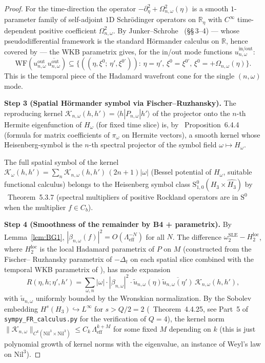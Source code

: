 \documentclass[11pt, a4paper]{article}
\newcommand{\RR}{\mathbb{R}}
\newcommand{\Hgroup}{H_3}
\newcommand{\Nil}{\mathrm{Nil}^3}
\newcommand{\piom}{\pi_\omega}
\newcommand{\WF}{\mathrm{WF}}
\newcommand{\om}{\omega}
\newcommand{\Lam}{\Lambda}
\newcommand{\Sym}{\mathrm{S}}
\newcommand{\dGhat}{\widehat{\Hgroup}}
\begin{document}
\begin{proof}
For the time-direction the operator $-\partial_\eta^2 + \Omega_{n,\om}^2(\eta)$
is a smooth $1$-parameter family of self-adjoint $1$D Schrödinger
operators on $\RR_\eta$ with $C^\infty$ time-dependent positive
coefficient $\Omega_{n,\om}^2$. By Junker--Schrohe~\cite{JS02}
(\S\S\,3--4) — whose pseudodifferential framework is the standard
Hörmander calculus on $\RR$, hence covered by \cite{HormIII} — the WKB
parametrix gives, for the in/out mode functions $u_{n,\om}^{\mathrm{in/out}}$:
\begin{equation}\label{eq:single_mode_WF}
  \WF(u_{n,\om}^{\mathrm{out}}\,\overline{u_{n,\om}^{\mathrm{out}}}) \subseteq
  \{((\eta,\xi^0;\,\eta',\xi^{0\prime})):\,
    \eta=\eta',\,\xi^0=\xi^{0\prime},\,
    \xi^0 = +\Omega_{n,\om}(\eta)\}.
\end{equation}
This is the temporal piece of the Hadamard wavefront cone for the single
$(n,\om)$ mode.

\textbf{Step 3 (Spatial Hörmander symbol via Fischer--Ruzhansky).}
The reproducing kernel
$\mathcal K_{n,\om}(h,h') = \langle h | P_{n,\om} | h'\rangle$
of the projector onto the $n$-th Hermite eigenfunction of $H_\om$
(for fixed time slice) is, by \cite{FR16}~Proposition~6.4.4 (formula for
matrix coefficients of $\piom$ on Hermite vectors), a smooth kernel whose
Heisenberg-symbol is the $n$-th spectral projector of the symbol field
$\om\mapsto H_\om$.

The full spatial symbol of the kernel
$\mathcal K_\om(h,h') = \sum_n \mathcal K_{n,\om}(h,h')\,(2n+1)|\om|$
(Bessel potential of $H_\om$, suitable functional calculus) belongs to
the Heisenberg symbol class $\Sym^0_{1,0}(\Hgroup\times\dGhat)$ by
\cite{FR16}~Theorem~5.3.7 (spectral multipliers of positive Rockland
operators are in $\Sym^0$ when the multiplier $f\in C_b$).

\textbf{Step 4 (Smoothness of the remainder by B4 + parametrix).}
By Lemma~\ref{lem:BG1}, $|\beta_{n,\om}(f)|^2 = O(\Lam_{\mathrm{eff}}^{-N})$
for all $N$. The difference
$\omega_2^{\mathrm{SLE}} - H_2^{\mathrm{loc}}$, where $H_2^{\mathrm{loc}}$ is
the local Hadamard parametrix of $P$ on $M$ (constructed from the Fischer--
Ruzhansky parametrix of $-\Delta_t$ on each spatial slice combined with
the temporal WKB parametrix of \cite{JS02}), has mode expansion
\begin{equation}\label{eq:remainder}
  R(\eta,h;\eta',h') = \sum_{\om,n}|\om|\cdot|\beta_{n,\om}|^2\cdot
  \tilde u_{n,\om}(\eta)\overline{\tilde u_{n,\om}(\eta')}\,\mathcal K_{n,\om}(h,h'),
\end{equation}
with $\tilde u_{n,\om}$ uniformly bounded by the Wronskian normalization. By
the Sobolev embedding $H^s(\Hgroup)\hookrightarrow L^\infty$ for $s>Q/2=2$
(\cite{FR16}~Theorem~4.4.25, see Part~5 of \texttt{sympy\_FR\_calculus.py}
for the verification of $Q=4$), the kernel norm
$\|\mathcal K_{n,\om}\|_{C^k(\Nil\times\Nil)} \le C_k\,\Lam_{\mathrm{eff}}^{k+M}$
for some fixed $M$ depending on $k$ (this is just polynomial growth of
kernel norms with the eigenvalue, an instance of Weyl's law on $\Nil$).


\end{proof}
\end{document}
